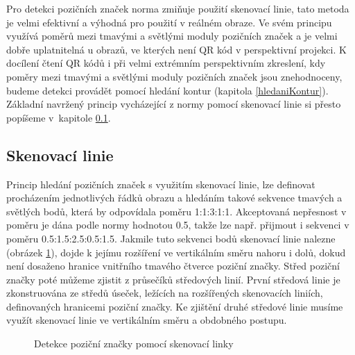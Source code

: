 Pro detekci pozičních značek norma zmiňuje použití skenovací linie, tato metoda
je velmi efektivní a výhodná pro použití v reálném obraze. Ve svém principu 
využívá poměrů mezi tmavými a světlými moduly pozičních značek a je velmi dobře
uplatnitelná u obrazů, ve kterých není QR kód v perspektivní projekci. K
docílení čtení QR kódů i při velmi extrémním perspektivním zkreslení, kdy poměry
mezi tmavými a světlými moduly pozičních značek jsou znehodnoceny, budeme
detekci provádět pomocí hledání kontur (kapitola \ref{hledaniKontur}). Základní
navržený princip vycházející z normy pomocí skenovací linie si přesto popíšeme
v~kapitole \ref{skenovaciLinie}.

\subsection{Skenovací linie}
\label{skenovaciLinie}

Princip hledání pozičních značek s využitím skenovací linie, lze definovat
procházením jednotlivých řádků obrazu a hledáním takové sekvence tmavých a
světlých bodů, která by odpovídala poměru 1:1:3:1:1. Akceptovaná nepřesnost v
poměru je dána podle normy hodnotou 0.5, takže lze např. přijmout i sekvenci v
poměru 0.5:1.5:2.5:0.5:1.5. Jakmile tuto sekvenci bodů skenovací linie nalezne
(obrázek \ref{QRCodeDetectionWithScanline}), dojde k jejímu rozšíření ve
vertikálním směru nahoru i dolů, dokud není dosaženo hranice vnitřního tmavého čtverce poziční značky. Střed poziční
značky poté můžeme zjistit z průsečíků středových linií. První středová linie je
zkonstruována ze středů úseček, ležících na rozšířených skenovacích liniích,
definovaných hranicemi poziční značky. Ke zjištění druhé středové linie musíme
využít skenovací linie ve vertikálním směru a obdobného postupu.

\begin{figure}[H]
  \begin{center}
    \caption{Detekce poziční značky pomocí skenovací linky}
    \label{QRCodeDetectionWithScanline}
  \end{center}
\end{figure}

